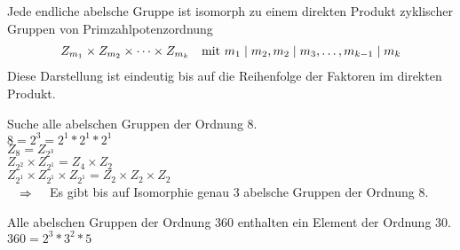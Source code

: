 \begin{thm}
	Jede endliche abelsche Gruppe ist isomorph zu einem direkten Produkt zyklischer Gruppen von Primzahlpotenzordnung
	\begin{align*}
	Z_{m_1} \times Z_{m_2} \times \cdots \times Z_{m_k} \quad \text{mit } m_1 \mid m_2, m_2 \mid m_3 , \dots , m_{k-1} \mid m_k
	\end{align*}
	Diese Darstellung ist eindeutig bis auf die Reihenfolge der Faktoren im direkten Produkt.
\end{thm}
\begin{bsp}
	Suche alle abelschen Gruppen der Ordnung 8.\\
	$8=2^3=2^1*2^1*2^1$ \\
	$Z_8 = Z_{2^3}$ \\
	$Z_{2^2} \times Z_{2^1} = Z_4 \times Z_2$ \\
	$Z_{2^1} \times Z_{2^1} \times Z_{2^1} = Z_2 \times Z_2 \times Z_2$\\
	$\quad \Rightarrow \quad$ Es gibt bis auf Isomorphie genau 3 abelsche Gruppen der Ordnung 8.
\end{bsp}
\begin{bsp}
	Alle abelschen Gruppen der Ordnung 360 enthalten ein Element der Ordnung 30. \\
	$360 = 2^3 * 3^2 * 5$
\end{bsp}